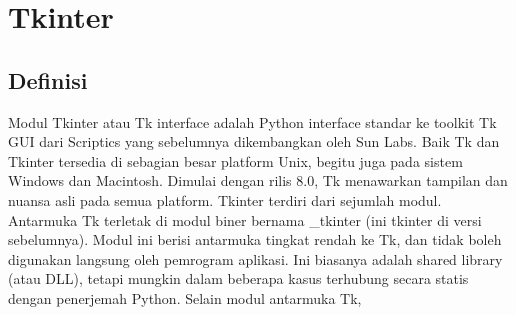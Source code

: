 \section {Tkinter}

\subsection{Definisi}
Modul Tkinter atau Tk interface adalah Python interface standar ke toolkit Tk GUI dari Scriptics yang sebelumnya dikembangkan oleh Sun Labs. Baik Tk dan Tkinter tersedia di sebagian besar platform Unix, begitu juga pada sistem Windows dan Macintosh. Dimulai dengan rilis 8.0, Tk menawarkan tampilan dan nuansa asli pada semua platform. Tkinter terdiri dari sejumlah modul. Antarmuka Tk terletak di modul biner bernama _tkinter (ini tkinter di versi sebelumnya). Modul ini berisi antarmuka tingkat rendah ke Tk, dan tidak boleh digunakan langsung oleh pemrogram aplikasi. Ini biasanya adalah shared library (atau DLL), tetapi mungkin dalam beberapa kasus terhubung secara statis dengan penerjemah Python. Selain modul antarmuka Tk,